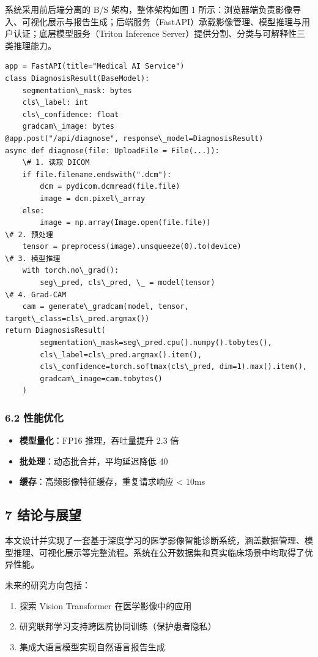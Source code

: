 \documentclass{harryopo-mathnotes}
\begin{document}
系统采用前后端分离的 B/S 架构，整体架构如图 1 所示：浏览器端负责影像导入、可视化展示与报告生成；后端服务（FastAPI）承载影像管理、模型推理与用户认证；底层模型服务（Triton Inference Server）提供分割、分类与可解释性三类推理能力。

\begin{verbatim}
app = FastAPI(title="Medical AI Service")
class DiagnosisResult(BaseModel):
    segmentation\_mask: bytes
    cls\_label: int
    cls\_confidence: float
    gradcam\_image: bytes
@app.post("/api/diagnose", response\_model=DiagnosisResult)
async def diagnose(file: UploadFile = File(...)):
    \# 1. 读取 DICOM
    if file.filename.endswith(".dcm"):
        dcm = pydicom.dcmread(file.file)
        image = dcm.pixel\_array
    else:
        image = np.array(Image.open(file.file))
\# 2. 预处理
    tensor = preprocess(image).unsqueeze(0).to(device)
\# 3. 模型推理
    with torch.no\_grad():
        seg\_pred, cls\_pred, \_ = model(tensor)
\# 4. Grad-CAM
    cam = generate\_gradcam(model, tensor, target\_class=cls\_pred.argmax())
return DiagnosisResult(
        segmentation\_mask=seg\_pred.cpu().numpy().tobytes(),
        cls\_label=cls\_pred.argmax().item(),
        cls\_confidence=torch.softmax(cls\_pred, dim=1).max().item(),
        gradcam\_image=cam.tobytes()
    )
\end{verbatim}

\subsubsection{6.2 性能优化}

\begin{itemize}
  \item \textbf{模型量化}：FP16 推理，吞吐量提升 2.3 倍
  \item \textbf{批处理}：动态批合并，平均延迟降低 40%
  \item \textbf{缓存}：高频影像特征缓存，重复请求响应 < 10ms
\end{itemize}

\subsection{7 结论与展望}

本文设计并实现了一套基于深度学习的医学影像智能诊断系统，涵盖数据管理、模型推理、可视化展示等完整流程。系统在公开数据集和真实临床场景中均取得了优异性能。

未来的研究方向包括：

\begin{enumerate}
  \item 探索 Vision Transformer 在医学影像中的应用
  \item 研究联邦学习支持跨医院协同训练（保护患者隐私）
  \item 集成大语言模型实现自然语言报告生成
\end{enumerate}
\end{document}
